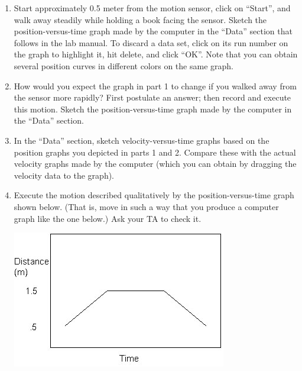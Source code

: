 \begin{enumerate}[label=\arabic*.]

\item Start approximately 0.5 meter from the motion sensor, click on ``Start'', and walk away steadily while holding a book facing the sensor.  Sketch the position-versus-time graph made by the computer in the ``Data'' section that follows in the lab manual.  To discard a data set, click on its run number on the graph to highlight it, hit delete, and click ``OK''.  Note that you can obtain several position curves in different colors on the same graph.

\item How would you expect the graph in part 1 to change if you walked away from the sensor more rapidly?  First postulate an answer; then record and execute this motion.  Sketch the position-versus-time graph made by the computer in the ``Data'' section.

\item In the ``Data'' section, sketch velocity-versus-time graphs based on the position graphs you depicted in parts 1 and 2.  Compare these with the actual velocity graphs made by the computer (which you can obtain by dragging the velocity data to the graph).

\item Execute the motion described qualitatively by the position-versus-time graph shown below.  (That is, move in such a way that you produce a computer graph like the one below.)  Ask your TA to check it.
\begin{center} \includegraphics*{imgs/6labs/6Alab/6Aexp2/exp_2_fig2_fx.jpg} \end{center}


\end{enumerate}
